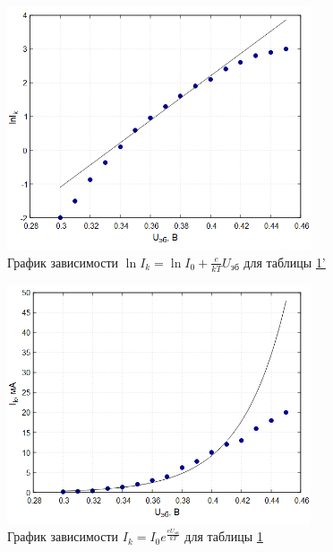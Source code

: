 \begin{figure}[H]
\centering
\includegraphics[width=0.8\textwidth]{Plot2.png}
\caption{График зависимости $\ln I_k = \ln I_0 + \frac{e}{kT}U_{\text{эб}}$ для таблицы \hyperref[tabl:2]{1'}}
\label{fig:plot2}
\end{figure}

\begin{figure}[H]
\centering
\includegraphics[width=0.8\textwidth]{Plot3.png}
\caption{График зависимости $I_k = I_0e^{\frac{eU_{\text{эб}}}{kT}}$ для таблицы \hyperref[tabl:2]{1}}
\label{fig:plot3}
\end{figure}

